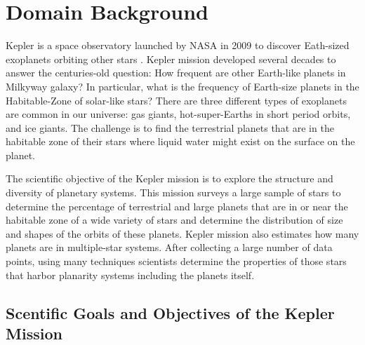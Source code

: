 
\chapter{Domain Background}

Kepler is a space observatory launched by NASA in 2009 to discover Eath-sized exoplanets orbiting other stars  \cite{2010ApJ...713L..87J}. Kepler mission developed several decades to answer the centuries-old question: How frequent are other Earth-like planets in Milkyway galaxy? In particular, what is the frequency of Earth-size planets in the Habitable-Zone of solar-like stars? There are three different types of exoplanets are common in our universe: gas giants, hot-super-Earths in short period orbits, and ice giants. The challenge is to find the terrestrial planets that are in the habitable zone of their stars where liquid water might exist on the surface on the planet.

The scientific objective of the Kepler mission is to explore the structure and diversity of planetary systems. This mission surveys a large sample of stars to determine the percentage of terrestrial and large planets that are in or near the habitable zone of a wide variety of stars and determine the distribution of size and shapes of the orbits of these planets. Kepler mission also estimates how many planets are in multiple-star systems. After collecting a large number of data points, using many techniques scientists determine the properties of those stars that harbor planarity systems including the planets itself. 

\section{Scentific Goals and Objectives of the Kepler Mission}

